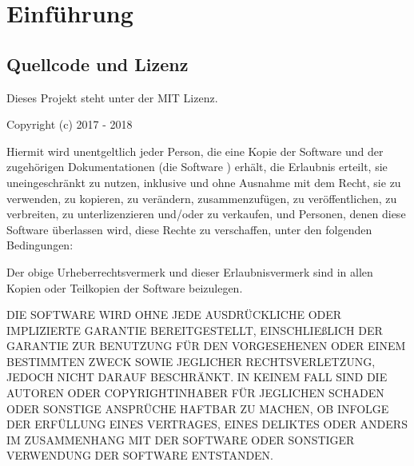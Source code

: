 \chapter{Einführung}
\label{cha:Einleitung}


\section{Quellcode und Lizenz}
\label{sec:licens_code}
Dieses Projekt steht unter der MIT Lizenz.

\vspace*{5mm} \noindent Copyright (c) 2017 - 2018 \autor

\vspace*{5mm} \noindent Hiermit wird unentgeltlich jeder Person, die eine Kopie der Software und der zugehörigen Dokumentationen (die \glqq Software \grqq) erhält, die Erlaubnis erteilt, sie uneingeschränkt zu nutzen, inklusive und ohne Ausnahme mit dem Recht, sie zu verwenden, zu kopieren, zu verändern, zusammenzufügen, zu veröffentlichen, zu verbreiten, zu unterlizenzieren und/oder zu verkaufen, und Personen, denen diese Software überlassen wird, diese Rechte zu verschaffen, unter den folgenden Bedingungen:

\noindent Der obige Urheberrechtsvermerk und dieser Erlaubnisvermerk sind in allen Kopien oder Teilkopien der Software beizulegen.

\vspace*{5mm} \noindent DIE SOFTWARE WIRD OHNE JEDE AUSDRÜCKLICHE ODER IMPLIZIERTE GARANTIE BEREITGESTELLT, EINSCHLIEßLICH DER GARANTIE ZUR BENUTZUNG FÜR DEN VORGESEHENEN ODER EINEM BESTIMMTEN ZWECK SOWIE JEGLICHER RECHTSVERLETZUNG, JEDOCH NICHT DARAUF BESCHRÄNKT. IN KEINEM FALL SIND DIE AUTOREN ODER COPYRIGHTINHABER FÜR JEGLICHEN SCHADEN ODER SONSTIGE ANSPRÜCHE HAFTBAR ZU MACHEN, OB INFOLGE DER ERFÜLLUNG EINES VERTRAGES, EINES DELIKTES ODER ANDERS IM ZUSAMMENHANG MIT DER SOFTWARE ODER SONSTIGER VERWENDUNG DER SOFTWARE ENTSTANDEN.
